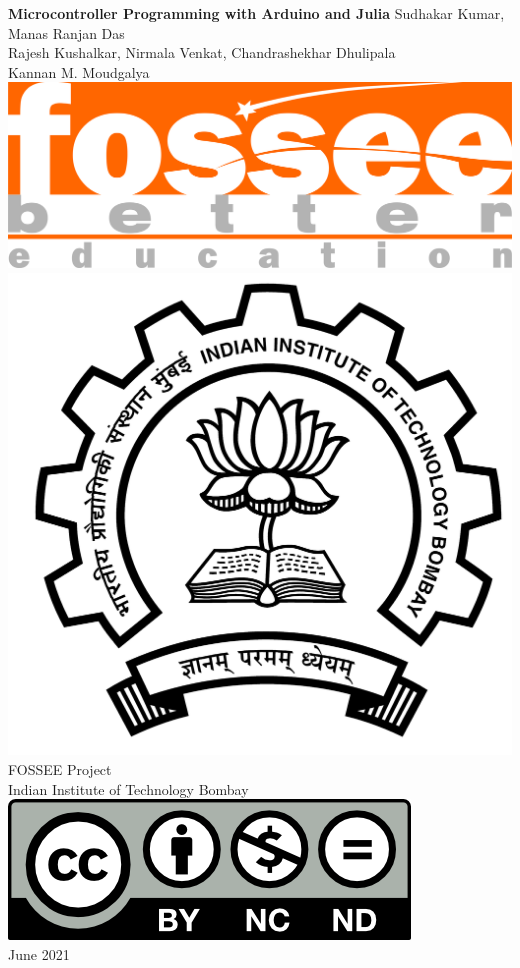 \begin{center}
    {\bf {\Huge Microcontroller Programming with Arduino and Julia}}
    \vfill
    Sudhakar Kumar, Manas Ranjan Das \\
    Rajesh Kushalkar, Nirmala Venkat, Chandrashekhar Dhulipala \\
    Kannan M. Moudgalya \\
    \vfill
    \includegraphics[width=0.3\linewidth]{suppl/fossee_logo_hi.png} \quad
    \includegraphics[width=0.2\linewidth]{suppl/IITB-logo-HighRes.png} \\
    FOSSEE Project \\
    Indian Institute of Technology Bombay \\ [2mm]
    \includegraphics[width=0.15\linewidth]{suppl/by-nc-nd.png} \\ [1mm]
    June 2021
\end{center}

\clearpage
